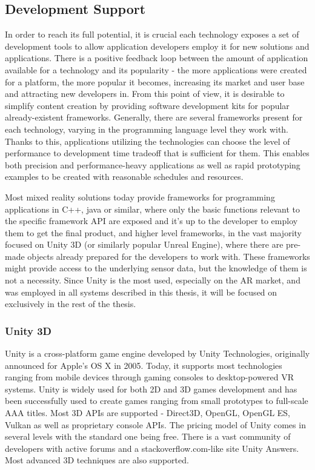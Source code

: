 \documentclass[12pt, a4paper]{article}
\newenvironment{definitions}
{\begin{description}[style=nextline]}
{\end{description}}
\begin{document}
\begin{definitions}
\end{definitions}

\subsection{Development Support}
In order to reach its full potential, it is crucial each technology exposes a set of development tools to allow application developers employ it for new solutions and applications. There is a positive feedback loop between the amount of application available for a technology and its popularity - the more applications were created for a platform, the more popular it becomes, increasing its market and user base and attracting new developers in. From this point of view, it is desirable to simplify content creation by providing software development kits for popular already-existent frameworks. Generally, there are several frameworks present for each technology, varying in the programming language level they work with. Thanks to this, applications utilizing the technologies can choose the level of performance to development time tradeoff that is sufficient for them. This enables both precision and performance-heavy applications as well as rapid prototyping examples to be created with reasonable schedules and resources.

Most mixed reality solutions today provide frameworks for programming applications in C++, java or similar, where only the basic functions relevant to the specific framework API are exposed and it’s up to the developer to employ them to get the final product, and higher level frameworks, in the vast majority focused on Unity 3D (or similarly popular Unreal Engine), where there are pre-made objects already prepared for the developers to work with. These frameworks might provide access to the underlying sensor data, but the knowledge of them is not a necessity. Since Unity is the most used, especially on the AR market, and was employed in all systems described in this thesis, it will be focused on exclusively in the rest of the thesis.

\subsubsection{Unity 3D}
Unity is a cross-platform game engine developed by Unity Technologies, originally announced for Apple’s OS X in 2005. Today, it supports most technologies ranging from mobile devices through gaming consoles to desktop-powered VR systems. Unity is widely used for both 2D and 3D games development and has been successfully used to create games ranging from small prototypes to full-scale AAA titles. Most 3D APIs are supported - Direct3D, OpenGL, OpenGL ES, Vulkan as well as proprietary console APIs. The pricing model of Unity comes in several levels with the standard one being free. There is a vast community of developers with active forums and a stackoverflow.com-like site Unity Answers. Most advanced 3D techniques are also supported.
\end{document}
